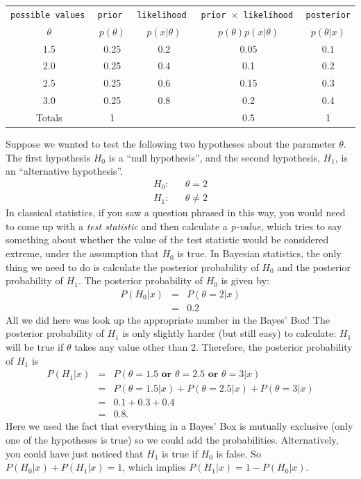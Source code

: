 \begin{table}[h!]
\begin{center}
\begin{tabular}{|c|c|c|c|c|}
\hline
\tt{possible values} & \tt{prior} & \tt{likelihood} & \tt{prior} $\times$ \tt{likelihood} & \tt{posterior}\\
$\theta$ & $p(\theta)$ & $p(x|\theta)$ & $p(\theta)p(x|\theta)$ & $p(\theta|x)$\\
\hline
1.5 & 0.25 & 0.2 & 0.05 & 0.1\\
2.0 & 0.25 & 0.4 & 0.1 & 0.2\\
2.5 & 0.25 & 0.6 & 0.15 & 0.3\\
3.0 & 0.25 & 0.8 & 0.2 & 0.4\\
\hline
Totals & 1 & & 0.5 & 1\\
\hline
\end{tabular}
\end{center}
\end{table}
Suppose we wanted to test the following two hypotheses about the parameter $\theta$.
The first hypothesis $H_0$ is a ``null hypothesis'', and the second hypothesis,
$H_1$, is an ``alternative hypothesis''.
\begin{eqnarray}
H_0: && \theta = 2\\
H_1: && \theta \neq 2
\end{eqnarray}
In classical statistics, if you saw a question phrased in this way, you would
need to come up with a {\it test statistic}
and then calculate a {\it p-value}, which tries to say something about whether
the value of the test statistic would be considered extreme, under the
assumption that $H_0$ is true.
In Bayesian statistics, the only thing we need to do is calculate
the posterior probability of $H_0$ and the posterior probability of $H_1$.
The posterior probability of $H_0$ is given by:
\begin{eqnarray}
P(H_0|x) &=& P(\theta = 2|x)\\
&=& 0.2
\end{eqnarray}
All we did here was look up the appropriate number in the Bayes' Box! The
posterior probability of $H_1$ is only slightly harder (but still easy)
to calculate: $H_1$ will
be true if $\theta$ takes any value other than 2. Therefore, the posterior
probability of $H_1$ is
\begin{eqnarray}
P(H_1|x) &=& P(\theta = 1.5 \textbf{ or } \theta = 2.5 \textbf{ or } \theta = 3|x)\\
&=& P(\theta = 1.5|x) + P(\theta = 2.5|x) + P(\theta = 3|x)\\
&=& 0.1 + 0.3 + 0.4\\
&=& 0.8.
\end{eqnarray}
Here we used the fact that everything in a Bayes' Box is mutually exclusive
(only one of the hypotheses is true) so we could add the probabilities.
Alternatively, you could have just noticed that $H_1$ is true if $H_0$ is false.
So $P(H_0|x) + P(H_1|x) = 1$, which implies $P(H_1|x) = 1 - P(H_0|x)$.

